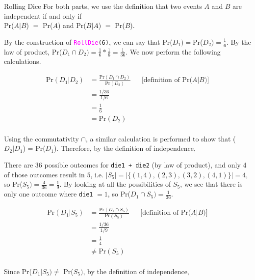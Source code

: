 \documentclass[11pt, nopagenumbers]{adamblan-hw}
\begin{document}
\begin{question}{Rolling Dice}
For both parts, we use the definition that two events $A$ and $B$ are independent if and only if
\\Pr($A | B$) $=$ Pr($A$) and Pr($B | A$) $=$ Pr($B$). 
\begin{part} By the construction of \texttt{\textcolor{magenta}{RollDie}(6)}, we can say that 
Pr($D_1) = $Pr($D_2) = \frac{1}{6}$. By the law of product, Pr($D_1 \cap D_2) = \frac{1}{6} * \frac{1}{6} = \frac{1}{36}$.
We now perform the following calculations.

\begin{align*}
\text{Pr}(D_1 | D_2) &= \frac{\text{Pr}(D_1 \cap D_2)}{\text{Pr}(D_2)} && \text{[definition of Pr($A | B$)]}\\
&=\frac{1/36}{1/6} \\
&= \frac{1}{6} \\
&= \text{Pr}(D_2) \\
\end{align*}

Using the commutativity $\cap$, a similar calculation is performed to show that ($D_2 | D_1$) = Pr($D_1$). Therefore, by the definition of independence, 
\end{part} 

\begin{part} There are 36 possible outcomes for \texttt{die1 + die2} (by law of product), and only 4 of those outcomes
result in $5$, i.e. $|S_5| = |\{(1, 4), (2, 3), (3, 2), (4, 1)\}| = 4$, so Pr($S_5) = \frac{4}{36} = \frac{1}{9}$. By looking at
all the possibilities of $S_5$, we see that there is only one outcome where \texttt{die1} $= 1$, so Pr($D_1 \cap S_5) = \frac{1}{36}$.

\begin{align*}
\text{Pr}(D_1 | S_5) &= \frac{\text{Pr}(D_1 \cap S_5)}{\text{Pr}(S_5)} && \text{[definition of Pr($A | B$)]}\\
&=\frac{1/36}{1/9} \\
&= \frac{1}{4} \\
&\neq \text{Pr}(S_5) \\
\end{align*}

Since Pr($D_1 |S_5) \neq $ Pr($S_5)$, by the definition of independence, \\
\end{part}
\end{question}
\end{document}
